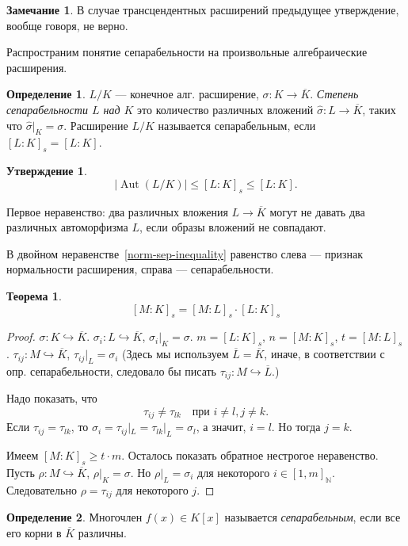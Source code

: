 \documentclass[12pt]{article}%
\renewcommand{\leq}{\leqslant}
\newcommand{\N}{\ensuremath{\mathbb N}}
\newcommand{\ol}{\overline}
\newcommand{\hto}{\hookrightarrow}
\renewcommand{\leq}{\leqslant}
\renewcommand{\geq}{\geqslant}
\DeclareMathOperator{\Aut}{Aut}
\newtheorem{Thm}{Теорема}[section]
\theoremstyle{remark}
\theoremstyle{definition}
\newtheorem{Prop}{Утверждение}
\newtheorem*{Remark}{Замечание}
\newtheorem{Def}{Определение}[section]
\begin{document}
\begin{Remark}
В случае трансцендентных расширений предыдущее утверждение, вообще говоря, не
верно.
\end{Remark}

Распространим понятие сепарабельности на произвольные алгебраические расширения.

\begin{Def}
$L/K$ — конечное алг. расширение, $\sigma\colon K \to \ol K$. \emph{Степень
сепарабельности $L$ над $K$} это количество различных вложений $\hat{\sigma}
\colon L \to \ol K$, таких что $\hat \sigma |_K = \sigma$. Расширение $L/K$ называется сепарабельным,
если $[L:K]_s = [L:K]$.
\end{Def}

\begin{Prop}
\begin{equation}\label{norm-sep-inequality}
    |\Aut(L/K)| \leq [L:K]_s \leq [L:K].
\end{equation}
\end{Prop}
Первое неравенство: два различных вложения $L \to \ol K$ могут не давать
два различных автоморфизма $L$, если образы вложений не совпадают.

В двойном неравенстве~\eqref{norm-sep-inequality} равенство слева — признак
нормальности расширения, справа — сепарабельности.

\begin{Thm}
\[
    [M:K]_s = [M:L]_s \cdot [L:K]_s
\] 
\end{Thm}
\begin{proof}
$\sigma\colon K \hto \ol K$. $\sigma_i\colon L \hto \ol K$, $\sigma_i|_K =
\sigma$. $m = [L:K]_s$, $n = [M:K]_s$, $t = [M:L]_s$. $\tau_{ij}\colon M \hto
\ol K$, $\tau_{ij}|_L = \sigma_i$ (Здесь мы используем $\ol L = \ol K$, иначе, в соответствии с опр.
сепарабельности, следовало бы писать $\tau_{ij}\colon M \hto \ol L$.)

Надо показать, что
\[
    \tau_{ij} \neq \tau_{lk} \quad \text{при } i\neq l, j\neq k.
\]
Если $\tau_{ij} = \tau_{lk}$, то $\sigma_i = \tau_{ij}|_L = \tau_{lk}|_L =
\sigma_l$, а значит, $i=l$. Но тогда $j=k$.

Имеем $[M:K]_s \geq t\cdot m$. Осталось показать обратное нестрогое неравенство.
Пусть $\rho \colon M \hto \ol K$, $\rho|_K=\sigma$. Но $\rho|_L=\sigma_i$ для
некоторого $i \in [1,m]_\N$. Следовательно $\rho = \tau_{ij}$ для некоторого
$j$.
\end{proof} 

\begin{Def}Многочлен $f(x) \in K[x]$ называется \emph{сепарабельным}, если все
его корни в $\ol K$ различны.
\end{Def}
\end{document}
